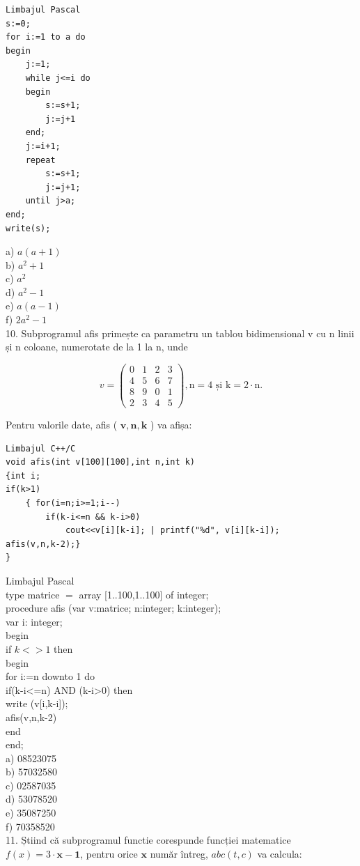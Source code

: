 \documentclass[10pt]{article}
\begin{document}
\begin{verbatim}
Limbajul Pascal
s:=0;
for i:=1 to a do
begin
    j:=1;
    while j<=i do
    begin
        s:=s+1;
        j:=j+1
    end;
    j:=i+1;
    repeat
        s:=s+1;
        j:=j+1;
    until j>a;
end;
write(s);
\end{verbatim}

a) $a(a+1)$\\
b) $a^{2}+1$\\
c) $a^{2}$\\
d) $a^{2}-1$\\
e) $a(a-1)$\\
f) $2 a^{2}-1$\\
10. Subprogramul afis primește ca parametru un tablou bidimensional v cu n linii și n coloane, numerotate de la 1 la n, unde

$$
v=\left(\begin{array}{llll}
0 & 1 & 2 & 3 \\
4 & 5 & 6 & 7 \\
8 & 9 & 0 & 1 \\
2 & 3 & 4 & 5
\end{array}\right), \mathrm{n}=4 \text { și } \mathrm{k}=2 \cdot \mathrm{n} .
$$

Pentru valorile date, afis ( $\mathbf{v}, \mathbf{n}, \mathbf{k}$ ) va afișa:

\begin{verbatim}
Limbajul C++/C
void afis(int v[100][100],int n,int k)
{int i;
if(k>1)
    { for(i=n;i>=1;i--)
        if(k-i<=n && k-i>0)
            cout<<v[i][k-i]; | printf("%d", v[i][k-i]);
afis(v,n,k-2);}
}
\end{verbatim}

Limbajul Pascal\\
type matrice $=$ array [1..100,1..100] of integer;\\
procedure afis (var v:matrice; n:integer; k:integer);\\
var i: integer;\\
begin\\
if $k<>1$ then\\
begin\\
for i:=n downto 1 do\\
if(k-i<=n) AND (k-i>0) then\\[0pt]
write (v[i,k-i]);\\
afis(v,n,k-2)\\
end\\
end;\\
a) 08523075\\
b) 57032580\\
c) 02587035\\
d) 53078520\\
e) 35087250\\
f) 70358520\\
11. Știind că subprogramul functie corespunde funcției matematice $f(x)=3 \cdot \mathbf{x - 1}$, pentru orice $\mathbf{x}$ număr întreg, $a b c(t, c)$ va calcula:
\end{document}
